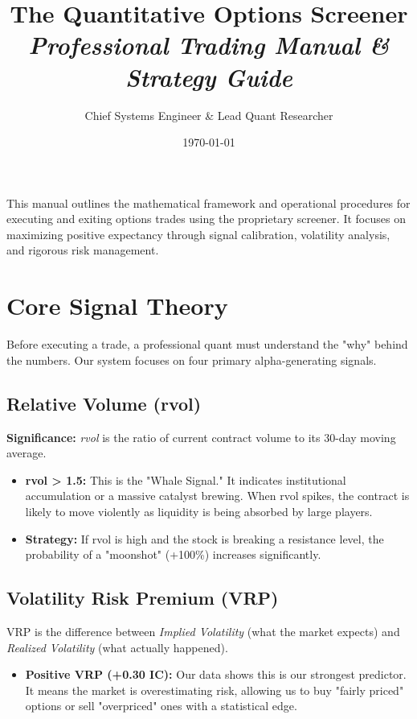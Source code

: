 \documentclass[11pt,a4paper]{article}
\title{
    \vspace{-1in}
    \textbf{\color{quantblue}The Quantitative Options Screener}\\
    \large \textit{Professional Trading Manual \& Strategy Guide}
}
\author{Chief Systems Engineer \& Lead Quant Researcher}
\date{\today}
\begin{document}
\maketitle

\begin{tcolorbox}[colback=quantblue!5,colframe=quantblue,title=Executive Summary]
This manual outlines the mathematical framework and operational procedures for executing and exiting options trades using the proprietary screener. It focuses on maximizing positive expectancy through signal calibration, volatility analysis, and rigorous risk management.
\end{tcolorbox}

\section{Core Signal Theory}
Before executing a trade, a professional quant must understand the "why" behind the numbers. Our system focuses on four primary alpha-generating signals.

\subsection{Relative Volume (rvol)}
\textbf{Significance:} \textit{rvol} is the ratio of current contract volume to its 30-day moving average.
\begin{itemize}
    \item \textbf{rvol > 1.5:} This is the "Whale Signal." It indicates institutional accumulation or a massive catalyst brewing. When rvol spikes, the contract is likely to move violently as liquidity is being absorbed by large players.
    \item \textbf{Strategy:} If rvol is high and the stock is breaking a resistance level, the probability of a "moonshot" (+100\%) increases significantly.
\end{itemize}

\subsection{Volatility Risk Premium (VRP)}
VRP is the difference between \textit{Implied Volatility} (what the market expects) and \textit{Realized Volatility} (what actually happened).
\begin{itemize}
    \item \textbf{Positive VRP (+0.30 IC):} Our data shows this is our strongest predictor. It means the market is overestimating risk, allowing us to buy "fairly priced" options or sell "overpriced" ones with a statistical edge.
\end{itemize}
\end{document}
